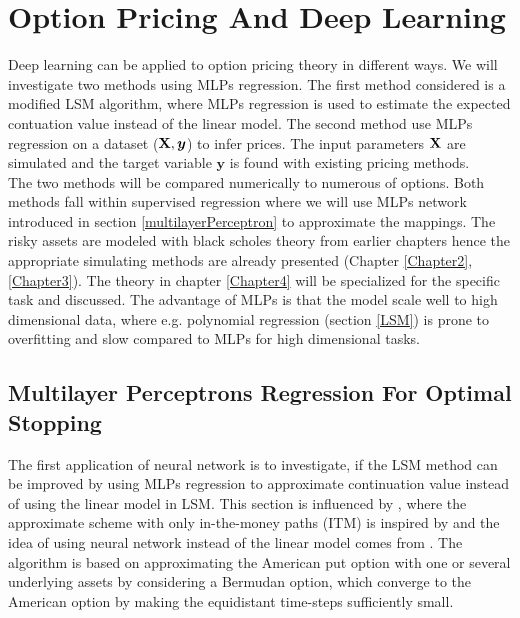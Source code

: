 
\chapter{Option Pricing And Deep Learning} %

\label{Chapter5} %

Deep learning can be applied to option pricing theory in different ways. We will investigate two methods using MLPs regression. The first method considered is a modified LSM algorithm, where MLPs regression is used to estimate the expected contuation value instead of the linear model. The second method use MLPs regression on a dataset ($\mathbf{X}, \bm{y}$) to infer prices. The input parameters $\mathbf{X}$ are simulated and the target variable $\bm{y}$ is found with existing pricing methods.\\

The two methods will be compared numerically to numerous of options. Both methods fall within supervised regression where we will use MLPs network introduced in section \ref{multilayerPerceptron} to approximate the mappings. The risky assets are modeled with black scholes theory from earlier chapters hence the appropriate simulating methods are already presented (Chapter \ref{Chapter2}, \ref{Chapter3}). The theory in chapter \ref{Chapter4} will be specialized for the specific task and discussed. The advantage of MLPs is that the model scale well to high dimensional data, where e.g. polynomial regression (section \ref{LSM}) is prone to overfitting and slow compared to MLPs for high dimensional tasks. 

\section{Multilayer Perceptrons Regression For Optimal Stopping}
The first application of neural network is to investigate, if the LSM method can be improved by using MLPs regression to approximate continuation value instead of using the linear model in LSM. This section is influenced by \parencite{LSM, Lelong19, KohlerMichael2010}, where the approximate scheme with only in-the-money paths (ITM) is inspired by \parencite{LSM} and the idea of using neural network instead of the linear model comes from \parencite{KohlerMichael2010, Lelong19}. The algorithm is based on approximating the American put option with one or several underlying assets by considering a Bermudan option, which converge to the American option by making the equidistant time-steps sufficiently small. \\

